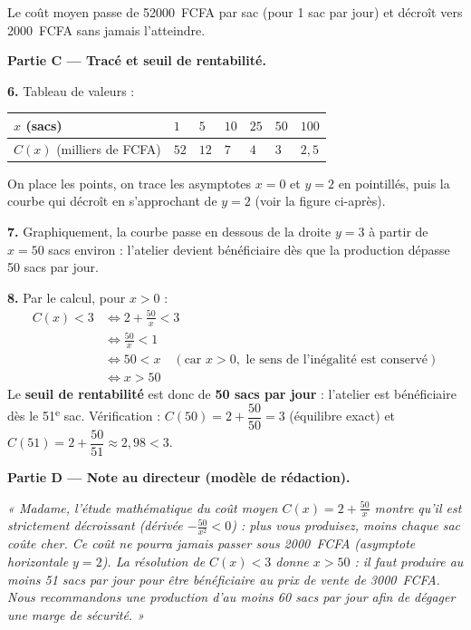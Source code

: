 \documentclass[11pt]{article}
\begin{document}
\begin{exoresolu}
Le coût moyen passe de \SI{52000}{FCFA} par sac (pour 1 sac par jour) et décroît vers \SI{2000}{FCFA} sans jamais l'atteindre.

\textbf{Partie C — Tracé et seuil de rentabilité.}

\textbf{6.} Tableau de valeurs :

\begin{center}
\begin{tabularx}{\linewidth}{|l|X|X|X|X|X|X|}
\hline
\rowcolor{popblueL} $x$ (sacs) & $1$ & $5$ & $10$ & $25$ & $50$ & $100$ \\ \hline
$C(x)$ (milliers de FCFA) & $52$ & $12$ & $7$ & $4$ & $3$ & $2{,}5$ \\ \hline
\end{tabularx}
\end{center}

On place les points, on trace les asymptotes $x = 0$ et $y = 2$ en pointillés, puis la courbe qui décroît en s'approchant de $y = 2$ (voir la figure ci-après).

\textbf{7.} Graphiquement, la courbe passe en dessous de la droite $y = 3$ à partir de $x = 50$ sacs environ : l'atelier devient bénéficiaire dès que la production dépasse 50 sacs par jour.

\textbf{8.} Par le calcul, pour $x > 0$ :
\begin{align*}
C(x) < 3 &\iff 2 + \frac{50}{x} < 3 \\
&\iff \frac{50}{x} < 1 \\
&\iff 50 < x \quad (\text{car } x > 0, \text{ le sens de l'inégalité est conservé}) \\
&\iff x > 50
\end{align*}
Le \textbf{seuil de rentabilité} est donc de \textbf{50 sacs par jour} : l'atelier est bénéficiaire dès le 51\textsuperscript{e} sac. Vérification : $C(50) = 2 + \dfrac{50}{50} = 3$ (équilibre exact) et $C(51) = 2 + \dfrac{50}{51} \approx 2{,}98 < 3$.

\textbf{Partie D — Note au directeur (modèle de rédaction).}

\emph{« Madame, l'étude mathématique du coût moyen $C(x) = 2 + \frac{50}{x}$ montre qu'il est strictement décroissant (dérivée $-\frac{50}{x^2} < 0$) : plus vous produisez, moins chaque sac coûte cher. Ce coût ne pourra jamais passer sous \SI{2000}{FCFA} (asymptote horizontale $y = 2$). La résolution de $C(x) < 3$ donne $x > 50$ : il faut produire au moins 51 sacs par jour pour être bénéficiaire au prix de vente de \SI{3000}{FCFA}. Nous recommandons une production d'au moins 60 sacs par jour afin de dégager une marge de sécurité. »}
\end{exoresolu}
\end{document}
